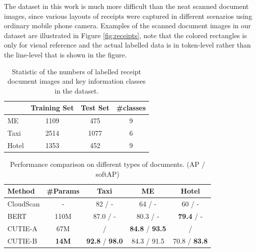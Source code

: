 \documentclass[10pt,twocolumn,letterpaper]{article}
\begin{document}
The dataset in this work is much more difficult than the neat scanned document images, since various layouts of receipts were captured in different scenarios using ordinary mobile phone camera. Examples of the scanned document images in our dataset are illustrated in Figure \ref{fig:receipts}, note that the colored rectangles is only for visual reference and the actual labelled data is in token-level rather than the line-level that is shown in the figure.
\begin{table}
	\caption{Statistic of the numbers of labelled receipt document images and key information classes in the dataset.}
\begin{center}
\begin{tabular}{l | c | c | c}
	 & Training Set & Test Set & \#classes \\
	\hline
	ME & 1109 & 475 & 9 \\
	Taxi & 2514 & 1077 & 6 \\
	Hotel & 1353 & 452 & 9 \\
\end{tabular}
\end{center}
	\label{tab:dataset}
\end{table}
\begin{table}
	\caption{Performance comparison on different types of documents. (AP / softAP)}
\begin{center}
\begin{tabular}{l | c | c | c | c}
	Method & \#Params & Taxi & ME & Hotel \\
	\hline
	CloudScan\cite{cloudscan} & - & 82 / - & 64 / - & 60 / - \\
	BERT\cite{bert} & 110M & 87.0 / - & 80.3 / - & \textbf{79.4} / - \\
	CUTIE-A & 67M & / & \textbf{84.8} / \textbf{93.5} & / \\
	CUTIE-B & \textbf{14M} & \textbf{92.8} / \textbf{98.0} & 84.3 / 91.5 & 70.8 / \textbf{83.8} \\
\end{tabular}
\end{center}
	\label{tab:comparison}
\end{table}
\end{document}
